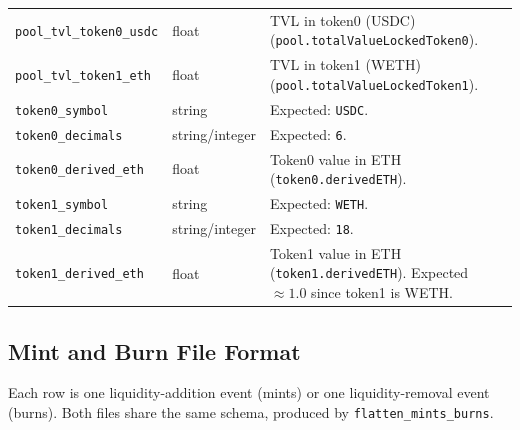 \documentclass[11pt,a4paper]{article}
\begin{document}
\begin{xltabular}{\linewidth}{L{4.5cm}L{3.0cm}Y}
\texttt{pool\_tvl\_token0\_usdc} & float & TVL in token0 (USDC)
  (\texttt{pool.totalValueLockedToken0}). \\
\texttt{pool\_tvl\_token1\_eth} & float & TVL in token1 (WETH)
  (\texttt{pool.totalValueLockedToken1}). \\
\texttt{token0\_symbol} & string & Expected: \texttt{USDC}. \\
\texttt{token0\_decimals} & string/integer & Expected: \texttt{6}. \\
\texttt{token0\_derived\_eth} & float & Token0 value in ETH
  (\texttt{token0.derivedETH}). \\
\texttt{token1\_symbol} & string & Expected: \texttt{WETH}. \\
\texttt{token1\_decimals} & string/integer & Expected: \texttt{18}. \\
\texttt{token1\_derived\_eth} & float & Token1 value in ETH
  (\texttt{token1.derivedETH}). Expected $\approx 1.0$ since
  token1 is WETH. \\
\bottomrule
\end{xltabular}

\subsection{Mint and Burn File Format}

Each row is one liquidity-addition event (mints) or one liquidity-removal
event (burns). Both files share the same schema, produced by
\texttt{flatten\_mints\_burns}.
\end{document}
